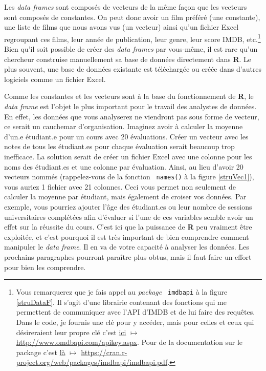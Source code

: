 \documentclass[10.5pt,a4paper]{article}
\newcommand{\rcode}[1]{\texttt{\color{rstudio} #1}}
\begin{document}
    Les \emph{data frames} sont composés de vecteurs de la même façon que les vecteurs sont composés de constantes. On peut donc avoir un film préféré (une constante), une liste de films que nous avons vus (un vecteur) ainsi qu'un fichier Excel regroupant ces films, leur année de publication, leur genre, leur score IMDB, etc.\footnote{Vous remarquerez que je fais appel au \emph{package} \rcode{imdbapi} à la figure \ref{struDataF}. Il s'agit d'une librairie contenant des fonctions qui me permettent de communiquer avec l'API d'IMDB et de lui faire des requêtes. Dans le code, je fournis une clé pour y accéder, mais pour celles et ceux qui désireraient leur propre clé c'est \href{http://www.omdbapi.com/apikey.aspx}{ici} $\mapsto$ \href{http://www.omdbapi.com/apikey.aspx}{http://www.omdbapi.com/apikey.aspx}. Pour de la documentation sur le package c'est \href{https://cran.r-project.org/web/packages/imdbapi/imdbapi.pdf}{là} $\mapsto$ \href{https://cran.r-project.org/web/packages/imdbapi/imdbapi.pdf}{https://cran.r-project.org/web/packages/imdbapi/imdbapi.pdf}.} Bien qu'il soit possible de créer des \emph{data frames} par vous-même, il est rare qu'un chercheur construise manuellement sa base de données directement dans \textbf{R}. Le plus souvent, une base de données existante est téléchargée ou créée dans d'autres logiciels comme un fichier Excel. 
    
    Comme les constantes et les vecteurs sont à la base du fonctionnement de \textbf{R}, le \emph{data frame} est l'objet le plus important pour le travail des analystes de données. En effet, les données que vous analyserez ne viendront pas sous forme de vecteur, ce serait un cauchemar d'organisation. Imaginez avoir à calculer la moyenne d'un.e étudiant.e pour un cours avec 20 évaluations. Créer un vecteur avec les notes de tous les étudiant.es pour chaque évaluation serait beaucoup trop inefficace. La solution serait de créer un fichier Excel avec une colonne pour les noms des étudiant.es et une colonne par évaluation. Ainsi, au lieu d'avoir 20 vecteurs nommés (rappelez-vous de la fonction \rcode{names()} à la figure \ref{struVec1}), vous auriez 1 fichier avec 21 colonnes. Ceci vous permet non seulement de calculer la moyenne par étudiant, mais également de croiser vos données. Par exemple, vous pourriez ajouter l'âge des étudiant.es ou leur nombre de sessions universitaires complétées afin d'évaluer si l'une de ces variables semble avoir un effet sur la réussite du cours. C'est ici que la puissance de \textbf{R} peu vraiment être exploitée, et c'est pourquoi il est très important de bien comprendre comment manipuler le \emph{data frame}. Il en va de votre capacité à analyser les données. Les prochains paragraphes pourront paraître plus obtus, mais il faut faire un effort pour bien les comprendre. 
    
\end{document}
